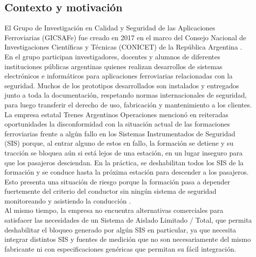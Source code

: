 
\subsection{Contexto y motivación}

El Grupo de Investigación en Calidad y Seguridad de las Aplicaciones Ferroviarias (GICSAFe) fue creado en 2017 en el marco del Consejo Nacional de Investigaciones Científicas y Técnicas (CONICET) de la República Argentina \cite{gicsafe}. En el grupo participan investigadores, docentes y alumnos de diferentes instituciones públicas argentinas quienes realizan desarrollos de sistemas electrónicos e informáticos para aplicaciones ferroviarias relacionadas con la seguridad. Muchos de los prototipos desarrollados son instalados y entregados junto a toda la documentación, respetando normas internacionales de seguridad, para luego transferir el derecho de uso, fabricación y mantenimiento a los clientes. \\



La empresa estatal Trenes Argentinos Operaciones \cite{trenes_arg} mencionó en reiteradas oportunidades la disconformidad con la situación actual de las formaciones ferroviarias frente a algún fallo en los Sistemas Instrumentados de Seguridad (SIS) porque, al entrar alguno de estos en fallo,
la formación se detiene y su tracción se bloquea aún si está lejos de una estación, en un lugar inseguro para que los pasajeros desciendan. En la práctica, se deshabilitan todos los SIS de la formación y se conduce hasta la próxima estación para descender a los pasajeros. Esto presenta una situación de riesgo porque la formación pasa a depender fuertemente del criterio del conductor sin ningún sistema de seguridad monitoreando y asistiendo la conducción \cite{salt_paper}. \\

Al mismo tiempo, la empresa no encuentra alternativas comerciales para satisfacer las necesidades de un Sistema de Aislado Limitado / 
Total, que permita deshabilitar el bloqueo generado por algún SIS en particular, ya que necesita integrar distintos SIS y fuentes de medición que no son necesariamente del mismo fabricante ni con especificaciones genéricas que permitan su fácil integración.  \\

